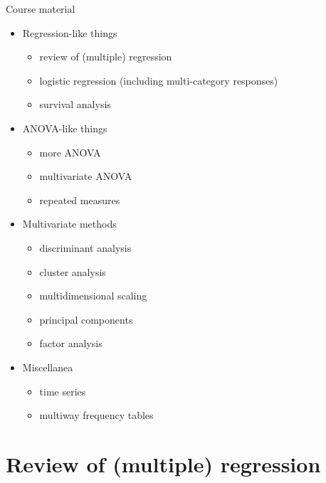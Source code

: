 \documentclass[ignorenonframetext,]{beamer}
\providecommand{\tightlist}{%
  \setlength{\itemsep}{0pt}\setlength{\parskip}{0pt}}
\begin{document}
\begin{frame}{Course material}
\protect\hypertarget{course-material}{}

\begin{itemize}
\tightlist
\item
  Regression-like things

  \begin{itemize}
  \tightlist
  \item
    review of (multiple) regression
  \item
    logistic regression (including multi-category responses)
  \item
    survival analysis
  \end{itemize}
\item
  ANOVA-like things

  \begin{itemize}
  \tightlist
  \item
    more ANOVA
  \item
    multivariate ANOVA
  \item
    repeated measures
  \end{itemize}
\item
  Multivariate methods

  \begin{itemize}
  \tightlist
  \item
    discriminant analysis
  \item
    cluster analysis
  \item
    multidimensional scaling
  \item
    principal components
  \item
    factor analysis
  \end{itemize}
\item
  Miscellanea

  \begin{itemize}
  \tightlist
  \item
    time series
  \item
    multiway frequency tables
  \end{itemize}
\end{itemize}

\end{frame}

\hypertarget{review-of-multiple-regression}{%
\section{Review of (multiple)
regression}\label{review-of-multiple-regression}}
\end{document}
